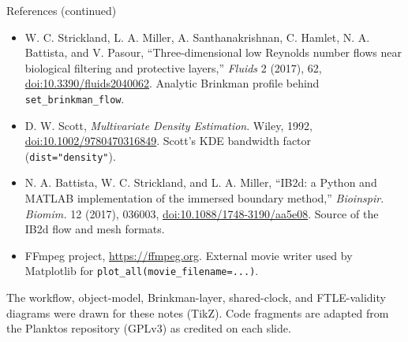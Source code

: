\documentclass[aspectratio=169,11pt]{beamer}
\begin{document}
\begin{frame}{References (continued)}
\footnotesize
\begin{itemize}\itemsep3pt
  \item W. C. Strickland, L. A. Miller, A. Santhanakrishnan, C. Hamlet, N. A. Battista, and V. Pasour, ``Three-dimensional low Reynolds number flows near biological filtering and protective layers,'' \emph{Fluids} 2 (2017), 62, \href{https://doi.org/10.3390/fluids2040062}{doi:10.3390/fluids2040062}. Analytic Brinkman profile behind \texttt{set\_brinkman\_flow}.
  \item D. W. Scott, \emph{Multivariate Density Estimation}. Wiley, 1992, \href{https://doi.org/10.1002/9780470316849}{doi:10.1002/9780470316849}. Scott's KDE bandwidth factor (\texttt{dist="density"}).
  \item N. A. Battista, W. C. Strickland, and L. A. Miller, ``IB2d: a Python and MATLAB implementation of the immersed boundary method,'' \emph{Bioinspir. Biomim.} 12 (2017), 036003, \href{https://doi.org/10.1088/1748-3190/aa5e08}{doi:10.1088/1748-3190/aa5e08}. Source of the IB2d flow and mesh formats.
  \item FFmpeg project, \url{https://ffmpeg.org}. External movie writer used by Matplotlib for \texttt{plot\_all(movie\_filename=...)}.
\end{itemize}
\begin{punchbox}
\footnotesize The workflow, object-model, Brinkman-layer, shared-clock, and FTLE-validity diagrams were drawn for these notes (TikZ). Code fragments are adapted from the Planktos repository (GPLv3) as credited on each slide.
\end{punchbox}
\end{frame}
\end{document}
